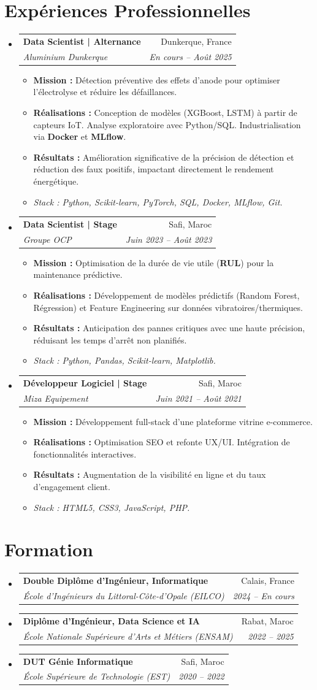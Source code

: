 \documentclass[a4paper,11pt]{article}
\makeatletter
\newcommand{\resumeItem}[1]{
  \item\small{
    {#1 \vspace{-2pt}}
  }
}
\newcommand{\resumeSubheading}[4]{
  \vspace{1pt}\item
    \begin{tabular*}{0.97\textwidth}[t]{l@{\extracolsep{\fill}}r}
      \textbf{#1} & \small #2 \\
      \textit{\small#3} & \textit{\small #4} \\
    \end{tabular*}\vspace{-6pt}
}
\newcommand{\resumeSubHeadingListStart}{\begin{itemize}[leftmargin=0.15in, label={}]}
\newcommand{\resumeSubHeadingListEnd}{\end{itemize}}
\newcommand{\resumeItemListStart}{\begin{itemize}[leftmargin=0.25in, labelsep=5pt, itemsep=1pt]}
\newcommand{\resumeItemListEnd}{\end{itemize}\vspace{-4pt}}
\makeatother
\begin{document}
\section{Expériences Professionnelles}
\resumeSubHeadingListStart

    \resumeSubheading
      {Data Scientist | Alternance}{Dunkerque, France}
      {Aluminium Dunkerque}{En cours -- Août 2025}
      \resumeItemListStart
        \resumeItem{\textbf{Mission :} Détection préventive des effets d'anode pour optimiser l'électrolyse et réduire les défaillances.}
        \resumeItem{\textbf{Réalisations :} Conception de modèles (XGBoost, LSTM) à partir de capteurs IoT. Analyse exploratoire avec Python/SQL. Industrialisation via \textbf{Docker} et \textbf{MLflow}.}
        \resumeItem{\textbf{Résultats :} Amélioration significative de la précision de détection et réduction des faux positifs, impactant directement le rendement énergétique.}
        \resumeItem{\textit{Stack : Python, Scikit-learn, PyTorch, SQL, Docker, MLflow, Git.}}
      \resumeItemListEnd

    \resumeSubheading
      {Data Scientist | Stage}{Safi, Maroc}
      {Groupe OCP}{Juin 2023 -- Août 2023}
      \resumeItemListStart
        \resumeItem{\textbf{Mission :} Optimisation de la durée de vie utile (\textbf{RUL}) pour la maintenance prédictive.}
        \resumeItem{\textbf{Réalisations :} Développement de modèles prédictifs (Random Forest, Régression) et Feature Engineering sur données vibratoires/thermiques.}
        \resumeItem{\textbf{Résultats :} Anticipation des pannes critiques avec une haute précision, réduisant les temps d'arrêt non planifiés.}
        \resumeItem{\textit{Stack : Python, Pandas, Scikit-learn, Matplotlib.}}
      \resumeItemListEnd

    \resumeSubheading
      {Développeur Logiciel | Stage}{Safi, Maroc}
      {Miza Equipement}{Juin 2021 -- Août 2021}
      \resumeItemListStart
        \resumeItem{\textbf{Mission :} Développement full-stack d'une plateforme vitrine e-commerce.}
        \resumeItem{\textbf{Réalisations :} Optimisation SEO et refonte UX/UI. Intégration de fonctionnalités interactives.}
        \resumeItem{\textbf{Résultats :} Augmentation de la visibilité en ligne et du taux d'engagement client.}
        \resumeItem{\textit{Stack : HTML5, CSS3, JavaScript, PHP.}}
      \resumeItemListEnd

\resumeSubHeadingListEnd

\section{Formation}
\resumeSubHeadingListStart
  \resumeSubheading
    {Double Diplôme d'Ingénieur, Informatique}{Calais, France}
    {École d'Ingénieurs du Littoral-Côte-d'Opale (EILCO)}{2024 -- En cours}
  \resumeSubheading
    {Diplôme d'Ingénieur, Data Science et IA}{Rabat, Maroc}
    {École Nationale Supérieure d'Arts et Métiers (ENSAM)}{2022 -- 2025}
  \resumeSubheading
    {DUT Génie Informatique}{Safi, Maroc}
    {École Supérieure de Technologie (EST)}{2020 -- 2022}
\resumeSubHeadingListEnd
\end{document}
